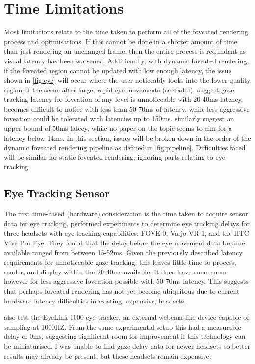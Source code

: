 \documentclass[a4paper,11pt]{article}
\begin{document}
\section{Time Limitations}
Most limitations relate to the time taken to perform all of the foveated rendering process and optimisations. If this cannot be done in a shorter amount of time than just rendering an unchanged frame, then the entire process is redundant as visual latency has been worsened. Additionally, with dynamic foveated rendering, if the foveated region cannot be updated with low enough latency, the issue shown in \cref{fig:eye} will occur where the user noticeably looks into the lower quality region of the scene after large, rapid eye movements (saccades). \textcite{albert2017latency} suggest gaze tracking latency for foveation of any level is unnoticeable with 20-40ms latency, becomes difficult to notice with less than 50-70ms of latency, while less aggressive foveation could be tolerated with latencies up to 150ms. \textcite{li2020optical} similarly suggest an upper bound of 50ms latecy, while no paper on the topic seems to aim for a latency below 14ms\cite{koskela2018instantaneous}. In this section, issues will be broken down in the order of the dynamic foveated rendering pipeline as defined in \cref{fig:pipeline}. Difficulties faced will be similar for static foveated rendering, ignoring parts relating to eye tracking.
\subsection{Eye Tracking Sensor}
The first time-based (hardware) consideration is the time taken to acquire sensor data for eye tracking. \textcite{stein2021comparison} performed experiments to determine eye tracking delays for three headsets with eye tracking capabilities: FOVE-0, Varjo VR-1, and the HTC Vive Pro Eye. They found that the delay before the eye movement data became available ranged from between 15-52ms. Given the previously described latency requirements for unnoticeable gaze tracking, this leaves little time to process, render, and display within the 20-40ms available. It does leave some room however for less aggressive foveation possible with 50-70ms latency. This suggests that perhaps foveated rendering has not yet become ubiquitous due to current hardware latency difficulties in existing, expensive, headsets.

\textcite{stein2021comparison} also test the EyeLink 1000 eye tracker, an external webcam-like device capable of sampling at 1000HZ. From the same experimental setup this had a measurable delay of 0ms, suggesting significant room for improvement if this technology can be miniaturised. I was unable to find gaze delay data for newer headsets so better results may already be present, but these headsets remain expensive.
\end{document}
